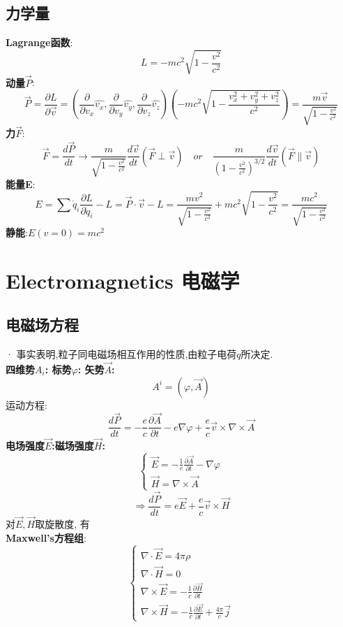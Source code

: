 \documentclass{article}
\begin{document}
\subsection{力学量}
\textbf{Lagrange函数}:
$$L = -m c^2 \sqrt{1 - \frac{v^2}{c^2}}$$
\textbf{动量$\vec P$}:
$$\vec P = \frac{\partial L}{\partial \vec v}= (\frac{\partial}{\partial v_x} \hat{v_x}, \frac{\partial}{\partial v_y} \hat{v_y}, \frac{\partial}{\partial v_z} \hat{v_z})(-m c^2 \sqrt{1 - \frac{v_x^2 + v_y^2 + v_z^2}{c^2}}) = \frac{m \vec v}{\sqrt{1 - \frac{v^2}{c^2}}}$$
\textbf{力$\vec F$}:
$$\vec F = \frac{d\vec P}{dt} \to \frac{m}{\sqrt{1 - \frac{v^2}{c^2}}} \frac{d\vec v}{dt}(\vec F \perp \vec v) \quad or\quad  \frac{m}{(1 - \frac{v^2}{c^2})^{3/2}} \frac{d\vec v}{dt} (\vec F \parallel \vec v)$$
\textbf{能量E}:
$$E = \sum \dot q_i \frac{\partial L}{\partial \dot q_i} - L = \vec P \cdot \vec v - L = \frac{m v^2}{\sqrt{1 - \frac{v^2}{c^2}}} + m c^2 \sqrt{1 - \frac{v^2}{c^2}} = \frac{mc^2}{\sqrt{1 - \frac{v^2}{c^2}}}$$
\textbf{静能}:\quad $E(v=0) = mc^2$\\


\section{Electromagnetics 电磁学}
\subsection{电磁场方程}
· 事实表明,粒子同电磁场相互作用的性质,由粒子电荷$q$所决定.\\
\textbf{四维势$A_{i}$: \quad 标势$\varphi$: \quad 矢势$\vec A$:}
$$A^{i}=(\varphi,\vec A)$$
运动方程:
$$\frac{d\vec P}{dt} = - \frac{e}{c} \frac{\partial\vec A}{\partial t} - e \nabla \varphi + \frac{e}{c} \vec v \times \nabla \times \vec A$$
\textbf{电场强度$\vec E$:\quad 磁场强度$\vec H$:}
\begin{displaymath}
    \left\{ \begin{array}{ll}
    \vec E = -\frac{1}{c} \frac{\partial \vec A}{\partial t} - \nabla \varphi\\
    \vec H = \nabla \times \vec A
    \end{array} \right.
\end{displaymath}
$$\Rightarrow \frac{d\vec P}{dt} = e \vec E + \frac{e}{c} \vec v \times \vec H$$
对$\vec E,\vec H$取旋散度, 有\\
\textbf{Maxwell's方程组}:
\begin{displaymath}
    \left\{ \begin{array}{ll}
    \nabla \cdot \vec E = 4\pi\rho\\
    \nabla \cdot \vec H = 0\\
    \nabla \times \vec E = - \frac{1}{c} \frac{\partial \vec H}{\partial t}\\
    \nabla \times \vec H = - \frac{1}{c} \frac{\partial \vec E}{\partial t} + \frac{4\pi}{c}\vec j
    \end{array} \right.
\end{displaymath}
\end{document}
